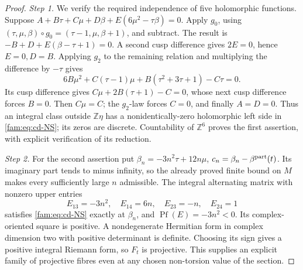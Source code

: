 \begin{proof}
\par\noindent\textit{Step 1.} We verify the required independence of five holomorphic functions.
Suppose \(A+B\tau+C\mu+D\beta+E(6\mu^2-\tau\beta)=0\).
Apply \(g_0\), using \((\tau,\mu,\beta)\circ g_0=(\tau-1,\mu,\beta+1)\),
and subtract. The result is \(-B+D+E(\beta-\tau+1)=0\).
A second cusp difference gives \(2E=0\), hence \(E=0,D=B\).
Applying \(g_2\) to the remaining relation and multiplying the difference
by \(-\tau\) gives
\[
 6B\mu^2+C(\tau-1)\mu+B(\tau^2+3\tau+1)-C\tau=0.
\]
Its cusp difference gives \(C\mu+2B(\tau+1)-C=0\), whose next cusp
difference forces \(B=0\). Then \(C\mu=C\); the \(g_2\)-law forces
\(C=0\), and finally \(A=D=0\). Thus an integral class outside
\(\mathbb Z\eta\) has a nonidentically-zero holomorphic left side in
\eqref{fam:eq:cd-NS}; its zeros are discrete. Countability of \(\mathbb Z^6\)
proves the first assertion, with explicit verification of its reduction.

\par\noindent\textit{Step 2.} For the second assertion put
\(\beta_n=-3n^2\tau+12n\mu\),
\(c_n=\beta_n-\beta^{\rm part}(t)\). Its imaginary part tends to
minus infinity, so the already proved finite bound on \(M\) makes every
sufficiently large \(n\) admissible. The integral alternating matrix
with nonzero upper entries
\[
 E_{13}=-3n^2,\quad E_{14}=6n,\quad E_{23}=-n,\quad E_{24}=1
\]
satisfies \eqref{fam:eq:cd-NS} exactly at \(\beta_n\), and
\(\operatorname{Pf}(E)=-3n^2<0\). Its complex-oriented square is positive.
A nondegenerate Hermitian form in complex dimension two with positive
determinant is definite. Choosing its sign gives a positive integral
Riemann form, so \(F_t\) is projective. This supplies an explicit family
of projective fibres even at any chosen non-torsion value of the section.
\end{proof}

